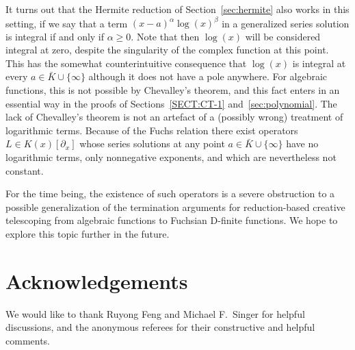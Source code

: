\documentclass{sig-alternate-05-2015}
\begin{document}
It turns out that the Hermite reduction of Section~\ref{sec:hermite} also works in this setting, if we say that
a term $(x-a)^\alpha\log(x)^\beta$ in a generalized series solution is integral if and only if $\alpha\geq0$.
Note that then $\log(x)$ will be considered integral at zero, despite the singularity of the complex
function at this point. This has the somewhat counterintuitive consequence that $\log(x)$ is integral at
every $a\in\bar K\cup\{\infty\}$ although it does not have a pole anywhere. For algebraic functions,
this is not possible by Chevalley's theorem, and this fact enters in an essential way in the proofs of
Sections~\ref{SECT:CT-1} and~\ref{sec:polynomial}. The lack of Chevalley's theorem is not an artefact of a (possibly
wrong) treatment of logarithmic terms. Because of the Fuchs relation \cite[p.~241]{schlesinger95} there exist operators
$L\in K(x)[\partial_x]$ whose series solutions at any point $a\in\bar K\cup\{\infty\}$ have no logarithmic
terms, only nonnegative exponents, and which are nevertheless not constant.

For the time being, the existence of such operators is a severe obstruction to a possible generalization of
the termination arguments for reduction-based creative telescoping from algebraic functions to Fuchsian D-finite
functions. We hope to explore this topic further in the future.

\section*{Acknowledgements}

We would like to thank Ruyong Feng and Michael F.\ Singer for helpful discussions,
and the anonymous referees for their constructive and helpful comments.


%
%
\end{document}
